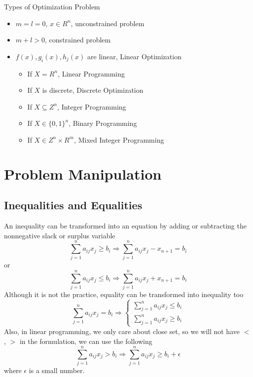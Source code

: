 			Types of Optimization Problem
			\begin{itemize}
				\item $m = l = 0$, $x \in R^n$, unconstrained problem
				\item $m + l > 0$, constrained problem
				\item $f(x), g_i(x), h_j(x)$ are linear, Linear Optimization
				\begin{itemize}
					\item If $X=R^n$, Linear Programming
					\item If $X$ is discrete,  Discrete Optimization
					\item If $X \subseteq Z^n$, Integer Programming
					\item If $X\in \{0,1\}^n$, Binary Programming
					\item If $X\in Z^n \times R^m$, Mixed Integer Programming
				\end{itemize}
			\end{itemize}

		\section{Problem Manipulation}
			\subsection{Inequalities and Equalities}
				An inequality can be transformed into an equation by adding or subtracting the nonnegative slack or surplus variable
				\begin{equation}
					\sum_{j=1}^na_{ij}x_j \ge b_i \Rightarrow \sum_{j=1}^na_{ij}x_j - x_{n+1} = b_i 
				\end{equation}
				or
				\begin{equation}
					\sum_{j=1}^na_{ij}x_j \le b_i \Rightarrow \sum_{j=1}^na_{ij}x_j + x_{n+1} = b_i 
				\end{equation}
				Although it is not the practice, equality can be transformed into inequality too
				\begin{equation}
					\sum_{j=1}^na_{ij}x_j = b_i \Rightarrow \begin{cases}\sum_{j=1}^na_{ij}x_j \le b_i \\ \sum_{j=1}^na_{ij}x_j \ge b_i \end{cases} 
				\end{equation}
				Also, in linear programming, we only care about close set, so we will not have $<$, $>$ in the formulation, we can use the following
				\begin{equation}
					\sum_{j=1}^na_{ij}x_j > b_i \Rightarrow \sum_{j=1}^na_{ij}x_j \ge b_i + \epsilon 
				\end{equation}
				where $\epsilon$ is a small number.

